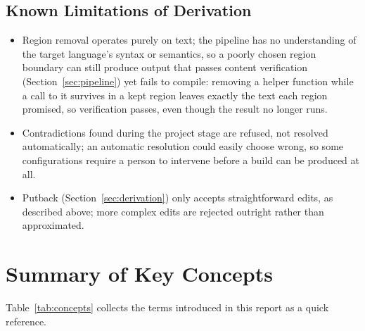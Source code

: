 \documentclass[11pt]{article}
\begin{document}
\subsection{Known Limitations of Derivation}

\begin{itemize}[leftmargin=1.4em]
  \item Region removal operates purely on text; the pipeline has no
    understanding of the target language's syntax or semantics, so a
    poorly chosen region boundary can still produce output that passes
    content verification (Section~\ref{sec:pipeline}) yet fails to
    compile: removing a helper function while a call to it survives in a
    kept region leaves exactly the text each region promised, so
    verification passes, even though the result no longer runs.
  \item Contradictions found during the project stage are refused, not
    resolved automatically; an automatic resolution could easily choose
    wrong, so some configurations require a person to intervene before a
    build can be produced at all.
  \item Putback (Section~\ref{sec:derivation}) only accepts straightforward
    edits, as described above; more complex edits are rejected outright
    rather than approximated.
\end{itemize}

\section{Summary of Key Concepts}

Table~\ref{tab:concepts} collects the terms introduced in this report as
a quick reference.
\end{document}
